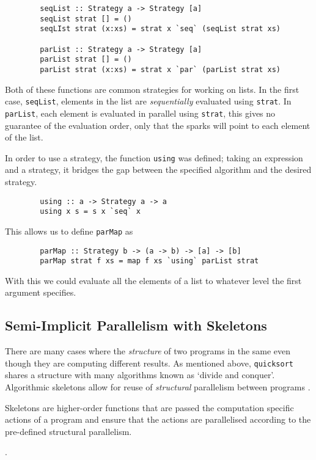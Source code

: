\begin{verbatim}
        seqList :: Strategy a -> Strategy [a]
        seqList strat [] = ()
        seqLIst strat (x:xs) = strat x `seq` (seqList strat xs)

        parList :: Strategy a -> Strategy [a]
        parList strat [] = ()
        parList strat (x:xs) = strat x `par` (parList strat xs)
\end{verbatim}

Both of these functions are common strategies for working on lists. In the first
case, \verb=seqList=, elements in the list are \emph{sequentially} evaluated
using \verb=strat=. In \verb=parList=, each element is evaluated in parallel
using \verb=strat=, this gives no guarantee of the evaluation order, only that
the sparks will point to each element of the list.

In order to use a strategy, the function \verb=using= was defined; taking an
expression and a strategy, it bridges the gap between the specified algorithm
and the desired strategy.

\begin{verbatim}
        using :: a -> Strategy a -> a
        using x s = s x `seq` x
\end{verbatim}

This allows us to define \verb=parMap= as

\begin{verbatim}
        parMap :: Strategy b -> (a -> b) -> [a] -> [b]
        parMap strat f xs = map f xs `using` parList strat
\end{verbatim}

With this we could evaluate all the elements of a list to whatever level the
first argument specifies.

\subsection{Semi-Implicit Parallelism with Skeletons}

There are many cases where the \emph{structure} of two programs in the same
even though they are computing different results. As mentioned above,
\verb|quicksort| shares a structure with many algorithms known as `divide and
conquer'. Algorithmic skeletons allow for reuse of \emph{structural} parallelism
between programs .

Skeletons are higher-order functions that are passed the computation specific actions
of a program and ensure that the actions are parallelised according to the pre-defined
structural parallelism.

.
